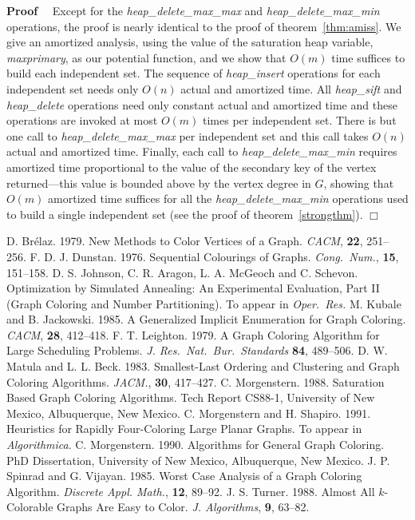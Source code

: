 \noindent
{\bf Proof} \ \ 
Except for the {\em heap\_delete\_max\_max\/} and {\em heap\_delete\_max\_min\/}
operations, the proof is nearly identical to the proof of 
theorem~\ref{thm:amiss}.  We give an amortized analysis, using the value of 
the saturation heap variable, {\em maxprimary}, as our potential function, 
and we show that $O(m)$ time suffices to build each independent set.  The 
sequence of {\em heap\_insert\/} operations for each independent set needs 
only $O(n)$ actual and amortized time.  All {\em heap\_sift\/} and 
{\em heap\_delete\/} operations need only constant actual and amortized time 
and these operations are invoked at most $O(m)$ times per independent set.
There is but one call to {\em heap\_delete\_max\_max\/} per independent set and 
this call takes $O(n)$ actual and amortized time.  Finally, each call to 
{\em heap\_delete\_max\_min\/} requires amortized time proportional to the 
value of the secondary key of the vertex returned---this value is bounded 
above by the vertex degree in $G$, showing that $O(m)$ amortized time suffices
for all the {\em heap\_delete\_max\_min\/} operations used to build a single 
independent set (see the proof of theorem~\ref{strongthm}).
\hfill $\Box$
\medskip

\begin{thebibliography}{99}
    D. Br\'elaz.  1979.
    New Methods to Color Vertices of a Graph.
    {\em CACM},
    {\bf 22},
    251--256.
    F. D. J. Dunstan. 1976.
    Sequential Colourings of Graphs.
    {\em Cong.\ Num.},
    {\bf 15},
    151--158.
    D. S. Johnson, C. R. Aragon, L. A. McGeoch and C. Schevon.
    Optimization by Simulated Annealing: An Experimental Evaluation, 
    Part II (Graph Coloring and Number Partitioning).  
    To appear in {\em Oper.\ Res.}
     M. Kubale and B. Jackowski. 1985.
     A Generalized Implicit Enumeration for Graph Coloring.
     {\em CACM},
     {\bf 28},
     412--418.
    F. T. Leighton.  1979.
    A Graph Coloring Algorithm for Large Scheduling Problems.
    {\em J. Res.\ Nat.\ Bur.\ Standards}
    {\bf 84},
    489--506.
    D. W. Matula and L. L. Beck.  1983.  
    Smallest-Last Ordering and Clustering and Graph Coloring Algorithms.  
    {\em JACM.}, 
    {\bf 30}, 
    417--427.
    C. Morgenstern.  1988.
    Saturation Based Graph Coloring Algorithms.
    Tech Report CS88-1, University of New Mexico,
    Albuquerque, New Mexico.
    C. Morgenstern and H. Shapiro.  1991.
    Heuristics for Rapidly Four-Coloring Large Planar Graphs.
    To appear in {\em Algorithmica}.
    C. Morgenstern.  1990.
    Algorithms for General Graph Coloring.
    PhD Dissertation, University of New Mexico,
    Albuquerque, New Mexico.
    J. P. Spinrad and G. Vijayan.  1985.  
    Worst Case Analysis of a Graph Coloring Algorithm.  
    {\em Discrete Appl. Math.},
    {\bf 12}, 
    89--92.
    J. S. Turner.  1988.  
    Almost All $k$-Colorable Graphs Are Easy to Color.  
    {\em J. Algorithms},
    {\bf 9}, 
    63--82.
\end{thebibliography}

